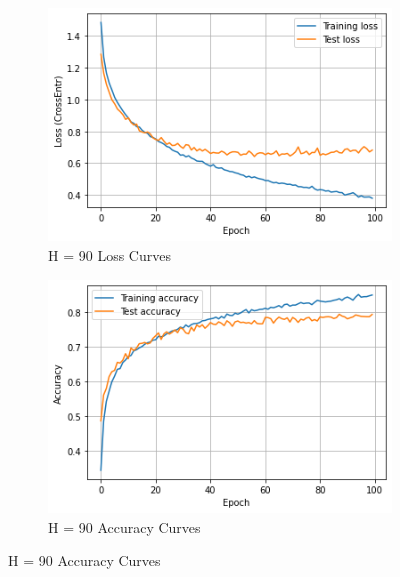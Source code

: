 \documentclass{homework}
\begin{document}
\begin{figure}[H]
\begin{subfigure}{0.4\textwidth}
\includegraphics[width=\linewidth]{hw3_h90_loss.png}
\caption{H = 90 Loss Curves} \label{fig:a}
\end{subfigure}\hspace*{\fill}
\begin{subfigure}{0.4\textwidth}
\includegraphics[width=\linewidth]{hw3_h90_acc.png}
\caption{H = 90 Accuracy Curves} \label{fig:b}
\end{subfigure}


\end{figure}
\end{document}
